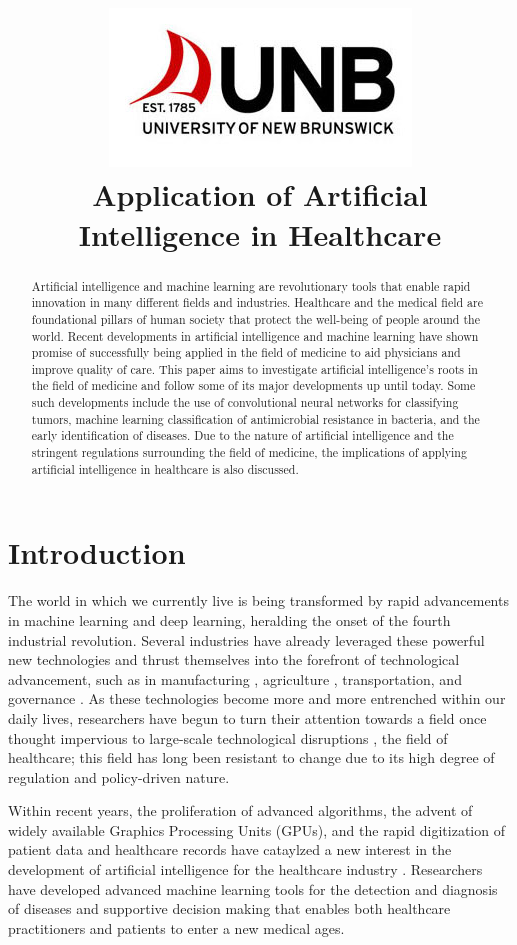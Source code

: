 \documentclass[a4paper]{article}
\title{\includegraphics[scale=0.75]{Resources/unblogo.jpg}\\Application of Artificial Intelligence in Healthcare}
\begin{document}
\maketitle

\begin{abstract}
    Artificial intelligence and machine learning are revolutionary tools that enable rapid innovation in many different fields and industries. Healthcare and the medical field are foundational pillars of human society that protect the well-being of people around the world. Recent developments in artificial intelligence and machine learning have shown promise of successfully being applied in the field of medicine to aid physicians and improve quality of care. This paper aims to investigate artificial intelligence's roots in the field of medicine and follow some of its major developments up until today. Some such developments include the use of convolutional neural networks for classifying tumors, machine learning classification of antimicrobial resistance in bacteria, and the early identification of diseases. Due to the nature of artificial intelligence and the stringent regulations surrounding the field of medicine, the implications of applying artificial intelligence in healthcare is also discussed.   
\end{abstract}

\newpage

\section{Introduction}

The world in which we currently live is being transformed by rapid advancements in machine learning and deep learning, heralding the onset of the fourth industrial revolution. Several industries have already leveraged these powerful new technologies and thrust themselves into the forefront of technological advancement, such as in manufacturing \cite{mohd_2022}, agriculture \cite{rashid_2024}, transportation, and governance \cite{qayyum_2021}. As these technologies become more and more entrenched within our daily lives, researchers have begun to turn their attention towards a field once thought impervious to large-scale technological disruptions \cite{qayyum_2021, latif_2017}, the field of healthcare; this field has long been resistant to change due to its high degree of regulation and policy-driven nature.

Within recent years, the proliferation of advanced algorithms, the advent of widely available Graphics Processing Units (GPUs), and the rapid digitization of patient data and healthcare records have cataylzed a new interest in the development of artificial intelligence for the healthcare industry \cite{jones_2018}. Researchers have developed advanced machine learning tools for the detection and diagnosis of diseases and supportive decision making that enables both healthcare practitioners and patients to enter a new medical ages. \
\end{document}
